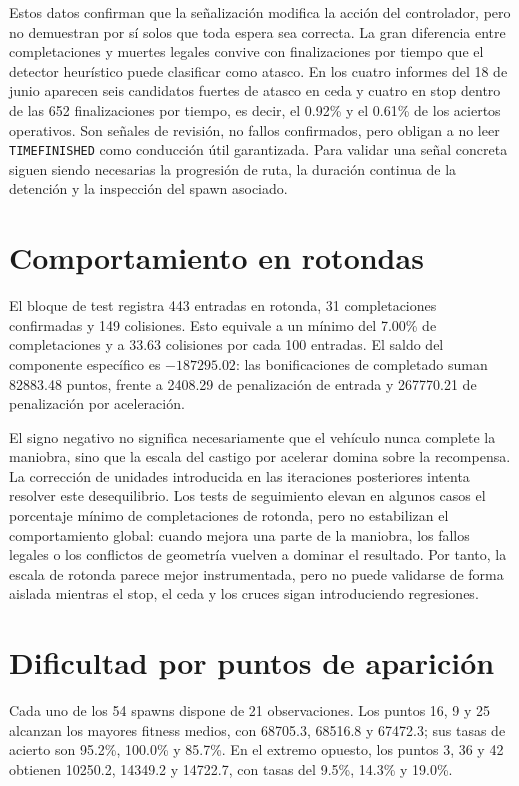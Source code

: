 Estos datos confirman que la señalización modifica la acción del controlador, pero no demuestran por sí solos que toda espera sea correcta. La gran diferencia entre completaciones y muertes legales convive con finalizaciones por tiempo que el detector heurístico puede clasificar como atasco. En los cuatro informes del 18 de junio aparecen seis candidatos fuertes de atasco en ceda y cuatro en stop dentro de las 652 finalizaciones por tiempo, es decir, el 0.92\% y el 0.61\% de los aciertos operativos. Son señales de revisión, no fallos confirmados, pero obligan a no leer \texttt{TIMEFINISHED} como conducción útil garantizada. Para validar una señal concreta siguen siendo necesarias la progresión de ruta, la duración continua de la detención y la inspección del spawn asociado.

\section{Comportamiento en rotondas}

El bloque de test registra 443 entradas en rotonda, 31 completaciones confirmadas y 149 colisiones. Esto equivale a un mínimo del 7.00\% de completaciones y a 33.63 colisiones por cada 100 entradas. El saldo del componente específico es \(-187295{.}02\): las bonificaciones de completado suman 82883.48 puntos, frente a 2408.29 de penalización de entrada y 267770.21 de penalización por aceleración.

El signo negativo no significa necesariamente que el vehículo nunca complete la maniobra, sino que la escala del castigo por acelerar domina sobre la recompensa. La corrección de unidades introducida en las iteraciones posteriores intenta resolver este desequilibrio. Los tests de seguimiento elevan en algunos casos el porcentaje mínimo de completaciones de rotonda, pero no estabilizan el comportamiento global: cuando mejora una parte de la maniobra, los fallos legales o los conflictos de geometría vuelven a dominar el resultado. Por tanto, la escala de rotonda parece mejor instrumentada, pero no puede validarse de forma aislada mientras el stop, el ceda y los cruces sigan introduciendo regresiones.

\section{Dificultad por puntos de aparición}

Cada uno de los 54 spawns dispone de 21 observaciones. Los puntos 16, 9 y 25 alcanzan los mayores fitness medios, con 68705.3, 68516.8 y 67472.3; sus tasas de acierto son 95.2\%, 100.0\% y 85.7\%. En el extremo opuesto, los puntos 3, 36 y 42 obtienen 10250.2, 14349.2 y 14722.7, con tasas del 9.5\%, 14.3\% y 19.0\%.

